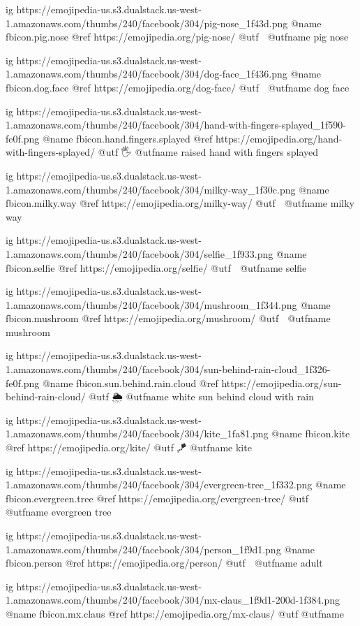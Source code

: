   ig https://emojipedia-us.s3.dualstack.us-west-1.amazonaws.com/thumbs/240/facebook/304/pig-nose_1f43d.png
  @name fbicon.pig.nose
  @ref https://emojipedia.org/pig-nose/
  @utf 🐽
  @utfname pig nose

  ig https://emojipedia-us.s3.dualstack.us-west-1.amazonaws.com/thumbs/240/facebook/304/dog-face_1f436.png
  @name fbicon.dog.face
  @ref https://emojipedia.org/dog-face/
  @utf 🐶
  @utfname dog face



  ig https://emojipedia-us.s3.dualstack.us-west-1.amazonaws.com/thumbs/240/facebook/304/hand-with-fingers-splayed_1f590-fe0f.png
  @name fbicon.hand.fingers.splayed
  @ref https://emojipedia.org/hand-with-fingers-splayed/
  @utf 🖐
  @utfname raised hand with fingers splayed

  ig https://emojipedia-us.s3.dualstack.us-west-1.amazonaws.com/thumbs/240/facebook/304/milky-way_1f30c.png
  @name fbicon.milky.way
  @ref https://emojipedia.org/milky-way/
  @utf 🌌
  @utfname milky way

  ig https://emojipedia-us.s3.dualstack.us-west-1.amazonaws.com/thumbs/240/facebook/304/selfie_1f933.png
  @name fbicon.selfie
  @ref https://emojipedia.org/selfie/
  @utf 🤳
  @utfname selfie

  ig https://emojipedia-us.s3.dualstack.us-west-1.amazonaws.com/thumbs/240/facebook/304/mushroom_1f344.png
  @name fbicon.mushroom
  @ref https://emojipedia.org/mushroom/
  @utf 🍄
  @utfname mushroom

  ig https://emojipedia-us.s3.dualstack.us-west-1.amazonaws.com/thumbs/240/facebook/304/sun-behind-rain-cloud_1f326-fe0f.png
  @name fbicon.sun.behind.rain.cloud
  @ref https://emojipedia.org/sun-behind-rain-cloud/
  @utf 🌦
  @utfname white sun behind cloud with rain

  ig https://emojipedia-us.s3.dualstack.us-west-1.amazonaws.com/thumbs/240/facebook/304/kite_1fa81.png
  @name fbicon.kite
  @ref https://emojipedia.org/kite/
  @utf 🪁
  @utfname kite

  ig https://emojipedia-us.s3.dualstack.us-west-1.amazonaws.com/thumbs/240/facebook/304/evergreen-tree_1f332.png
  @name fbicon.evergreen.tree
  @ref https://emojipedia.org/evergreen-tree/
  @utf 🌲
  @utfname evergreen tree

  ig https://emojipedia-us.s3.dualstack.us-west-1.amazonaws.com/thumbs/240/facebook/304/person_1f9d1.png
  @name fbicon.person
  @ref https://emojipedia.org/person/
  @utf 🧑
  @utfname adult

  ig https://emojipedia-us.s3.dualstack.us-west-1.amazonaws.com/thumbs/240/facebook/304/mx-claus_1f9d1-200d-1f384.png
  @name fbicon.mx.claus
  @ref https://emojipedia.org/mx-claus/
  @utf
  @utfname

